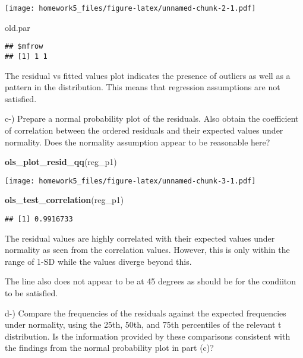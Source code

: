 \documentclass[
]{article}
\newenvironment{Shaded}{\begin{snugshade}}{\end{snugshade}}
\newcommand{\KeywordTok}[1]{\textcolor[rgb]{0.13,0.29,0.53}{\textbf{#1}}}
\newcommand{\NormalTok}[1]{#1}
\begin{document}
\texttt{[image: homework5\_files/figure-latex/unnamed-chunk-2-1.pdf]}

\begin{Shaded}
\begin{Highlighting}[]
\NormalTok{old.par}
\end{Highlighting}
\end{Shaded}

\begin{verbatim}
## $mfrow
## [1] 1 1
\end{verbatim}

The residual vs fitted values plot indicates the presence of outliers as
well as a pattern in the distribution. This means that regression
assumptions are not satisfied.

c-) Prepare a normal probability plot of the residuals. Also obtain the
coefficient of correlation between the ordered residuals and their
expected values under normality. Does the normality assumption appear to
be reasonable here?

\begin{Shaded}
\begin{Highlighting}[]
\KeywordTok{ols_plot_resid_qq}\NormalTok{(reg_p1)}
\end{Highlighting}
\end{Shaded}

\texttt{[image: homework5\_files/figure-latex/unnamed-chunk-3-1.pdf]}

\begin{Shaded}
\begin{Highlighting}[]
\KeywordTok{ols_test_correlation}\NormalTok{(reg_p1)}
\end{Highlighting}
\end{Shaded}

\begin{verbatim}
## [1] 0.9916733
\end{verbatim}

The residual values are highly correlated with their expected values
under normality as seen from the correlation values. However, this is
only within the range of 1-SD while the values diverge beyond this.

The line also does not appear to be at 45 degrees as should be for the
condiiton to be satisfied.

d-) Compare the frequencies of the residuals against the expected
frequencies under normality, using the 25th, 50th, and 75th percentiles
of the relevant t distribution. Is the information provided by these
comparisons consistent with the findings from the normal probability
plot in part (c)?
\end{document}
